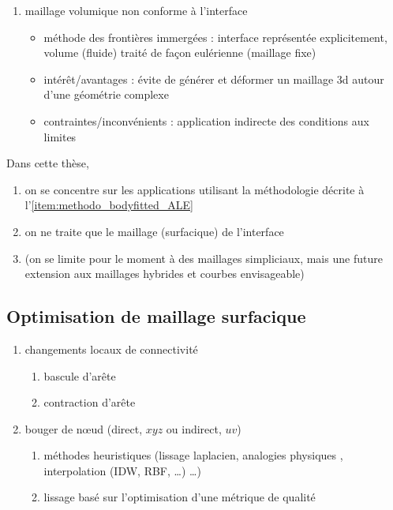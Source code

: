 \begin{enumerate}
	\item maillage volumique non conforme à l’interface
	\begin{itemize}
		\item méthode des frontières immergées \cite{peskin2002, hovnanian2012, wang2012} : interface représentée explicitement, volume (fluide) traité de façon eulérienne (\ie maillage fixe)
		\item intérêt/avantages : évite de générer et déformer un maillage 3d autour d’une géométrie complexe
		\item contraintes/inconvénients : application indirecte des conditions aux limites
	\end{itemize}
\end{enumerate}

Dans cette thèse,
\begin{enumerate}
	\item on se concentre sur les applications utilisant la méthodologie décrite à l'\autoref{item:methodo_bodyfitted_ALE}
	\item on ne traite que le maillage (surfacique) de l'interface
	\item (on se limite pour le moment à des maillages simpliciaux, mais une future extension aux maillages hybrides et courbes envisageable)
\end{enumerate}


\subsection{Optimisation de maillage surfacique}
\begin{enumerate}
	\item changements locaux de connectivité
	\begin{enumerate}
		\item bascule d'arête
		\item contraction d'arête
	\end{enumerate}
	\item bouger de n\oe ud (direct, \ie $xyz$ ou indirect, \ie $uv$)
	\begin{enumerate}
		\item méthodes heuristiques (lissage laplacien, analogies physiques \cite{farhat1998}, interpolation (IDW, RBF, \ldots) \ldots)
		\item lissage basé sur l'optimisation d'une métrique de qualité \cite{freitag1995, canann1998, jiao2008, gargallo2014}
	\end{enumerate}
\end{enumerate}

